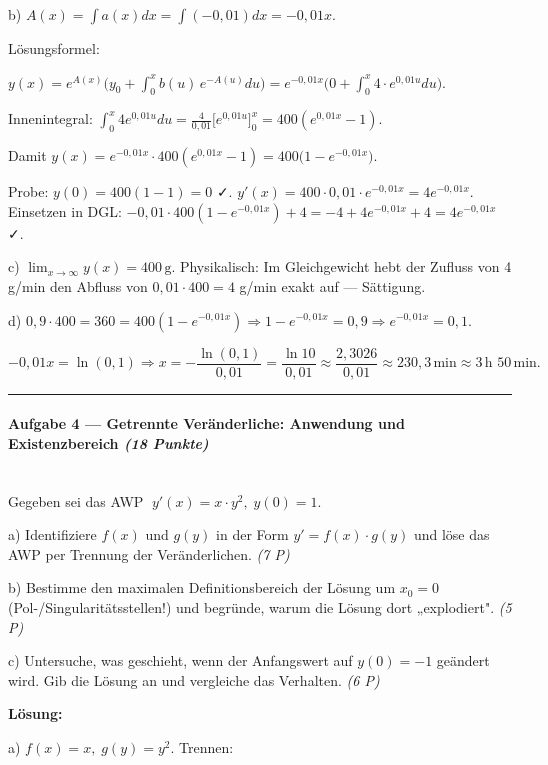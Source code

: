 \documentclass[11pt, a4paper]{article}
\begin{document}
b) $A(x)=\int a(x)dx=\int(-0{,}01)dx = -0{,}01x.$

Lösungsformel:

$y(x)=e^{A(x)}\Big(y_0+\int_0^x b(u)\,e^{-A(u)}du\Big)= e^{-0{,}01x}\Big(0+\int_0^x 4\cdot e^{0{,}01u}du\Big).$

Innenintegral: $\int_0^x 4e^{0{,}01u}du = \tfrac{4}{0{,}01}\big[e^{0{,}01u}\big]_0^x = 400(e^{0{,}01x}-1).$

Damit $y(x)=e^{-0{,}01x}\cdot 400(e^{0{,}01x}-1) = 400\big(1-e^{-0{,}01x}\big).$

Probe: $y(0)=400(1-1)=0$ ✓. $y'(x)=400\cdot 0{,}01\cdot e^{-0{,}01x}=4e^{-0{,}01x}$. Einsetzen in DGL: $-0{,}01\cdot 400(1-e^{-0{,}01x})+4 = -4+4e^{-0{,}01x}+4 = 4e^{-0{,}01x}$ ✓.


c) $\lim_{x\to\infty}y(x)=400\,\text{g}.$ Physikalisch: Im Gleichgewicht hebt der Zufluss von 4 g/min den Abfluss von $0{,}01\cdot 400 = 4$ g/min exakt auf — Sättigung.


d) $0{,}9\cdot 400 = 360 = 400(1-e^{-0{,}01x}) \Rightarrow 1-e^{-0{,}01x}=0{,}9 \Rightarrow e^{-0{,}01x}=0{,}1.$

$-0{,}01x=\ln(0{,}1) \Rightarrow x=-\dfrac{\ln(0{,}1)}{0{,}01}=\dfrac{\ln 10}{0{,}01}\approx \dfrac{2{,}3026}{0{,}01}\approx 230{,}3\,\text{min}\approx 3\,\text{h }50\,\text{min}.$



\noindent\textcolor{rulegray}{\rule{\linewidth}{0.4pt}}


\paragraph{Aufgabe 4 — Getrennte Veränderliche: Anwendung und Existenzbereich \textit{(18 Punkte)}}\mbox{}\\[2pt]

Gegeben sei das AWP $\;y'(x) = x\cdot y^2,\; y(0)=1.$


a) Identifiziere $f(x)$ und $g(y)$ in der Form $y'=f(x)\cdot g(y)$ und löse das AWP per Trennung der Veränderlichen. \textit{(7 P)}

b) Bestimme den maximalen Definitionsbereich der Lösung um $x_0=0$ (Pol-/Singularitätsstellen!) und begründe, warum die Lösung dort „explodiert". \textit{(5 P)}

c) Untersuche, was geschieht, wenn der Anfangswert auf $y(0)=-1$ geändert wird. Gib die Lösung an und vergleiche das Verhalten. \textit{(6 P)}


\textbf{Lösung:}


a) $f(x)=x,\; g(y)=y^2$. Trennen:
\end{document}

